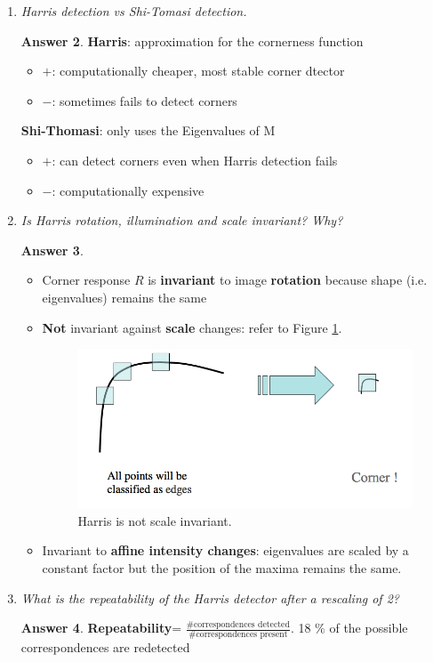 \documentclass[a4paper,12 pt]{article}
\theoremstyle{definition}
\theoremstyle{remark}
\theoremstyle{definition}
\theoremstyle{definition}
\theoremstyle{definition}
\theoremstyle{definition}
\theoremstyle{remark}
\theoremstyle{remark}
\theoremstyle{definition}
\theoremstyle{definition}
\newtheorem*{answer}{Answer}
\begin{document}
\begin{enumerate}
\begin{enumerate}
\begin{answer}
\end{answer}
\item \textit{Harris detection vs Shi-Tomasi detection.}
\begin{answer}
\textbf{Harris}: approximation for the cornerness function
\begin{itemize}
\item $+$: computationally cheaper, most stable corner dtector
\item $-$: sometimes fails to detect corners
\end{itemize}
\textbf{Shi-Thomasi}: only uses the Eigenvalues of M
\begin{itemize}
\item $+$:  can detect corners even when Harris detection fails
\item $-$: computationally expensive
\end{itemize}
\end{answer}
\item \textit{ Is Harris rotation, illumination and scale invariant? Why?}
\begin{answer}
\
\begin{itemize}
\item Corner response $R$ is \textbf{invariant} to image \textbf{rotation} because shape (i.e. eigenvalues) remains the same
\item \textbf{Not} invariant against \textbf{scale} changes: refer to Figure \ref{fig:harris_scale}.
\begin{figure}[h!]
\begin{center}
\includegraphics[scale=0.4]{pics/harris_corner}
\caption{Harris is not scale invariant. \label{fig:harris_scale}}
\end{center}
\end{figure}
\item Invariant to \textbf{affine intensity changes}: eigenvalues are scaled by a constant factor but the position of the maxima remains the same.
\end{itemize}
\end{answer}
\item \textit{What is the repeatability of the Harris detector after a rescaling of 2?}
\begin{answer}
\textbf{Repeatability}= $\frac{\# \text{correspondences detected}}{\# \text{correspondences present}}$. 18 $\%$ of the possible correspondences are redetected
\end{answer}
\end{enumerate}


\end{enumerate}
\end{document}
